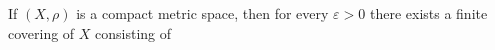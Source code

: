 If $(X, \rho)$ is a compact metric space, then for every $\varepsilon > 0$ there exists a finite covering of $X$ consisting of
